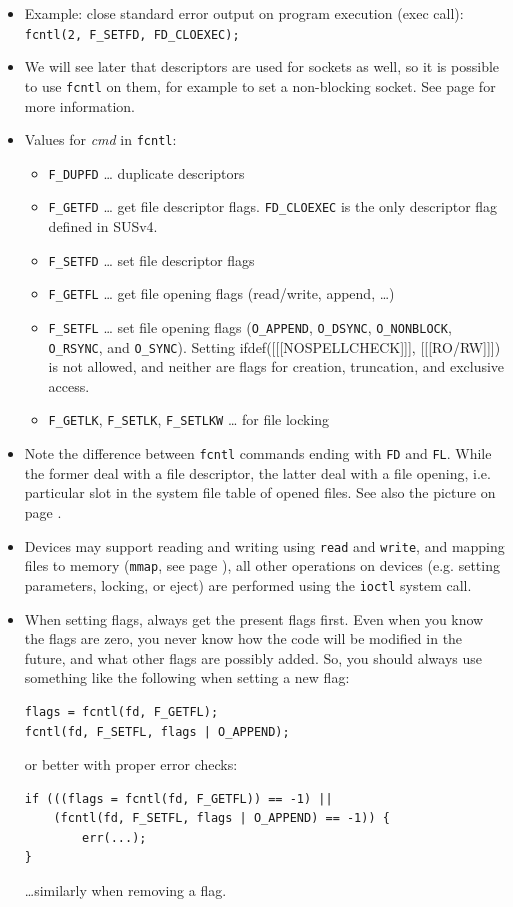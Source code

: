 \begin{itemize}
\item Example: close standard error output on program execution (exec call):\\
\texttt{fcntl(2, F\_SETFD, FD\_CLOEXEC);}
\item We will see later that descriptors are used for sockets as well, so it is
possible to use \texttt{fcntl} on them, for example to set a non-blocking
socket.  See page \pageref{CONNECT} for more information.
\item Values for \emph{cmd} in \texttt{fcntl}:
\begin{itemize}
\item \texttt{F\_DUPFD} \dots{} duplicate descriptors
\item \texttt{F\_GETFD} \dots{} get file descriptor flags.  \texttt{FD\_CLOEXEC}
is the only descriptor flag defined in SUSv4.
\item \texttt{F\_SETFD} \dots{} set file descriptor flags
\item \texttt{F\_GETFL} \dots{} get file opening flags (read/write, append,
\dots)
\item \texttt{F\_SETFL} \dots{} set file opening flags
(\texttt{O\_APPEND}, \texttt{O\_DSYNC}, \texttt{O\_NONBLOCK},
\texttt{O\_R\-SYNC}, and \texttt{O\_SYNC}).
Setting ifdef([[[NOSPELLCHECK]]], [[[RO/RW]]]) is not allowed, and neither are
flags for creation, truncation, and exclusive access.
\item \texttt{F\_GETLK}, \texttt{F\_SETLK}, \texttt{F\_SETLKW} \dots{}
for file locking
\end{itemize}
\item Note the difference between \texttt{fcntl} commands ending with
\texttt{FD} and \texttt{FL}. While the former deal with a file descriptor, the
latter deal with a file opening, i.e. particular slot in the system file table
of opened files. See also the picture on page \pageref{OPENFILETABLES}.
\item Devices may support reading and writing using \texttt{read} and
\texttt{write}, and mapping files to memory (\texttt{mmap}, see page
\pageref{MMAP}), all other operations on devices (e.g. setting parameters,
locking, or eject) are performed using the \texttt{ioctl} system call.
\item When setting flags, always get the present flags first.  Even when you
know the flags are zero, you never know how the code will be modified in the
future, and what other flags are possibly added.  So, you should always use
something like the following when setting a new flag:

\begin{verbatim}
flags = fcntl(fd, F_GETFL);
fcntl(fd, F_SETFL, flags | O_APPEND);
\end{verbatim}

or better with proper error checks:

\begin{verbatim}
if (((flags = fcntl(fd, F_GETFL)) == -1) ||
    (fcntl(fd, F_SETFL, flags | O_APPEND) == -1)) {
        err(...);
}
\end{verbatim}

\dots similarly when removing a flag.
\end{itemize}

